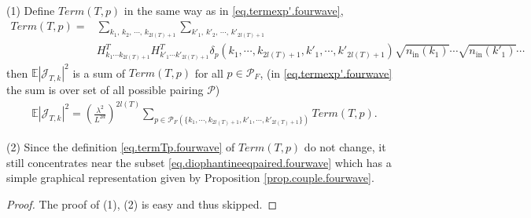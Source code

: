  \begin{prop}\label{prop.termcouple.fourwave} 
 (1) Define $Term(T,p)$ in the same way as in \eqref{eq.termexp'.fourwave},
 \begin{equation}\label{eq.termTp.fourwave}
 \begin{split}
  Term(T, p)=&\sum_{k_1,\, k_2,\, \cdots,\, k_{2l(T)+1}}\sum_{k'_1,\, k'_2,\, \cdots,\, k'_{2l(T)+1}}
  \\
  &H^T_{k_1\cdots k_{2l(T)+1}} H^{T}_{k'_1\cdots k'_{2l(T)+1}} \delta_{p}(k_1,\cdots, k_{2l(T)+1}, k'_1,\cdots, k'_{2l(T)+1})\sqrt{n_{\textrm{in}}(k_1)}\cdots\sqrt{n_{\textrm{in}}(k'_1)}\cdots
 \end{split}
 \end{equation}
 then $\mathbb{E}|\mathcal{J}_{T,k}|^2$ is a sum of $Term(T,p)$ for all $p\in \mathcal{P}_F$, (in \eqref{eq.termexp'.fourwave} the sum is over set of all possible pairing $\mathcal{P}$)
 \begin{equation}\label{eq.termexp.fourwave}
 \begin{split}
  \mathbb{E}|\mathcal{J}_{T,k}|^2=\left(\frac{\lambda^2}{L^{2d}}\right)^{2l(T)}
  \sum_{p\in \mathcal{P}_F(\{k_1,\cdots, k_{2l(T)+1}, k'_1,\cdots, k'_{2l(T)+1}\})} Term(T, p).
 \end{split}
 \end{equation}
 
 (2) Since the definition \eqref{eq.termTp.fourwave} of $Term(T,p)$ do not change, it still concentrates near the subset \eqref{eq.diophantineeqpaired.fourwave} which has a simple graphical representation given by Proposition \ref{prop.couple.fourwave}. 
 \end{prop}
 
 \begin{proof} The proof of (1), (2) is easy and thus skipped.
 \end{proof}
 
 
 

